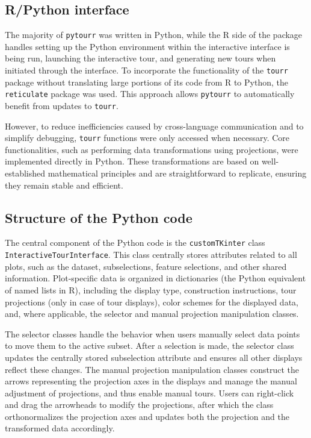\documentclass[article]{ajs}
\begin{document}
\subsection{R/Python interface}

The majority of \texttt{pytourr} was written in Python, while the R side of the package handles setting up the Python environment within the interactive interface is being run, launching the interactive tour, and generating new tours when initiated through the interface. To incorporate the functionality of the \texttt{tourr} package without translating large portions of its code from R to Python, the \texttt{reticulate} package was used. This approach allows \texttt{pytourr} to automatically benefit from updates to \texttt{tourr}.

However, to reduce inefficiencies caused by cross-language communication and to simplify debugging, \texttt{tourr} functions were only accessed when necessary. Core functionalities, such as performing data transformations using projections, were implemented directly in Python. These transformations are based on well-established mathematical principles and are straightforward to replicate, ensuring they remain stable and efficient.

\subsection{Structure of the Python code}

The central component of the Python code is the \texttt{customTKinter} class \texttt{InteractiveTourInterface}. This class centrally stores attributes related to all plots, such as the dataset, subselections, feature selections, and other shared information. Plot-specific data is organized in dictionaries (the Python equivalent of named lists in R), including the display type, construction instructions, tour projections (only in case of tour displays), color schemes for the displayed data, and, where applicable, the selector and manual projection manipulation classes.

The selector classes handle the behavior when users manually select data points to move them to the active subset. After a selection is made, the selector class updates the centrally stored subselection attribute and ensures all other displays reflect these changes. The manual projection manipulation classes construct the arrows representing the projection axes in the displays and manage the manual adjustment of projections, and thus enable manual tours. Users can right-click and drag the arrowheads to modify the projections, after which the class orthonormalizes the projection axes and updates both the projection and the transformed data accordingly.
\end{document}
